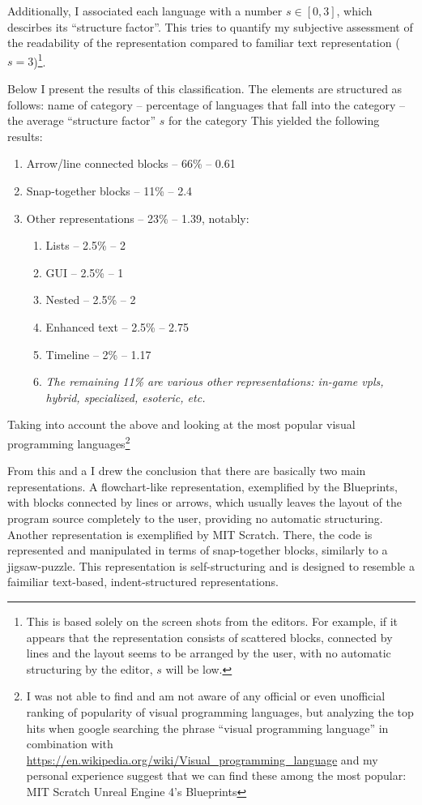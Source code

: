 Additionally, I associated each language with a number $s \in [0, 3]$, which descirbes its ``structure factor''. This tries to quantify my subjective assessment of the readability of the representation compared to familiar text representation ($s = 3$)\footnote{This is based solely on the screen shots from the editors. For example, if it appears that the representation consists of scattered blocks, connected by lines and the layout seems to be arranged by the user, with no automatic structuring by the editor, $s$ will be low.}.

Below I present the results of this classification. The elements are structured as follows: name of category -- percentage of languages that fall into the category -- the average ``structure factor'' $s$ for the category
This yielded the following results:
\begin{enumerate}
    \item Arrow/line connected blocks -- 66\% -- 0.61
    \item Snap-together blocks -- 11\% -- 2.4
    \item Other representations -- 23\% -- 1.39, notably:
    \begin{enumerate}
        \item Lists -- 2.5\% -- 2
        \item GUI -- 2.5\% -- 1
        \item Nested -- 2.5\% -- 2
        \item Enhanced text -- 2.5\% -- 2.75
        \item Timeline -- 2\% -- 1.17
        \item \textit{The remaining 11\% are various other representations: in-game \acrshort{vpl}s, hybrid, specialized, esoteric, etc.}
    \end{enumerate}
\end{enumerate}

Taking into account the above and looking at the most popular visual programming languages\footnote{I was not able to find and am not aware of any official or even unofficial ranking of popularity of visual programming languages, but analyzing the top hits when google searching the phrase ``visual programming language'' in combination with \url{https://en.wikipedia.org/wiki/Visual_programming_language} and my personal experience suggest that we can find these among the most popular:
MIT Scratch
Unreal Engine 4's Blueprints}

From this and a I drew the conclusion that there are basically two main representations. A flowchart-like representation, exemplified by the Blueprints, with blocks connected by lines or arrows, which usually leaves the layout of the program source completely to the user, providing no automatic structuring. Another representation is exemplified by MIT Scratch. There, the code is represented and manipulated in terms of snap-together blocks, similarly to a jigsaw-puzzle. This representation is self-structuring and is designed to resemble a faimiliar text-based, indent-structured representations.


